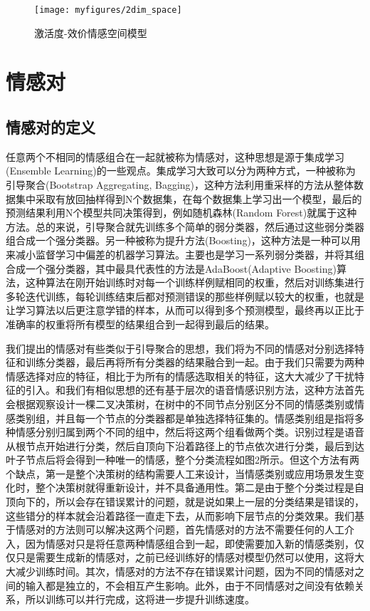 \begin{figure}[H] %
    \centering
    \texttt{[image: myfigures/2dim\_space]}
    \caption{激活度-效价情感空间模型}
    \label{fig:xfig1}
\end{figure}

\section{情感对}

\subsection{情感对的定义}
任意两个不相同的情感组合在一起就被称为情感对，这种思想是源于集成学习(Ensemble Learning)的一些观点。集成学习大致可以分为两种方式，一种被称为引导聚合(Bootstrap Aggregating, Bagging)，这种方法利用重采样的方法从整体数据集中采取有放回抽样得到N个数据集，在每个数据集上学习出一个模型，最后的预测结果利用N个模型共同决策得到，例如随机森林(Random Forest)就属于这种方法。总的来说，引导聚合就先训练多个简单的弱分类器，然后通过这些弱分类器组合成一个强分类器。另一种被称为提升方法(Boosting)，这种方法是一种可以用来减小监督学习中偏差的机器学习算法。主要也是学习一系列弱分类器，并将其组合成一个强分类器，其中最具代表性的方法是AdaBoost(Adaptive Boosting)算法，这种算法在刚开始训练时对每一个训练样例赋相同的权重，然后对训练集进行多轮迭代训练，每轮训练结束后都对预测错误的那些样例赋以较大的权重，也就是让学习算法以后更注意学错的样本，从而可以得到多个预测模型，最终再以正比于准确率的权重将所有模型的结果组合到一起得到最后的结果。

我们提出的情感对有些类似于引导聚合的思想，我们将为不同的情感对分别选择特征和训练分类器，最后再将所有分类器的结果融合到一起。由于我们只需要为两种情感选择对应的特征，相比于为所有的情感选取相关的特征，这大大减少了干扰特征的引入。和我们有相似思想的还有基于层次的语音情感识别方法，这种方法首先会根据观察设计一棵二叉决策树，在树中的不同节点分别区分不同的情感类别或情感类别组，并且每一个节点的分类器都是单独选择特征集的。情感类别组是指将多种情感分别归属到两个不同的组中，然后将这两个组看做两个类。识别过程是语音从根节点开始进行分类，然后自顶向下沿着路径上的节点依次进行分类，最后到达叶子节点后将会得到一种唯一的情感，整个分类流程如图2所示。但这个方法有两个缺点，第一是整个决策树的结构需要人工来设计，当情感类别或应用场景发生变化时，整个决策树就得重新设计，并不具备通用性。第二是由于整个分类过程是自顶向下的，所以会存在错误累计的问题，就是说如果上一层的分类结果是错误的，这些错分的样本就会沿着路径一直走下去，从而影响下层节点的分类效果。我们基于情感对的方法则可以解决这两个问题，首先情感对的方法不需要任何的人工介入，因为情感对只是将任意两种情感组合到一起，即使需要加入新的情感类别，仅仅只是需要生成新的情感对，之前已经训练好的情感对模型仍然可以使用，这将大大减少训练时间。其次，情感对的方法不存在错误累计问题，因为不同的情感对之间的输入都是独立的，不会相互产生影响。此外，由于不同情感对之间没有依赖关系，所以训练可以并行完成，这将进一步提升训练速度。

